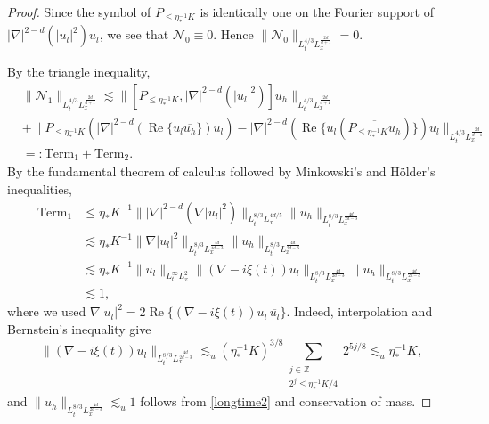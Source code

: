 \documentclass[reqno,11pt]{amsart}
\theoremstyle{plain}
\theoremstyle{definition}
\numberwithin{equation}{section}
\numberwithin{theorem}{section}
\def\leq{\leqslant}
\begin{document}
\begin{proof}
Since the symbol of $P_{\leq \eta_{\ast}^{-1}K}$ is identically one on the Fourier support of $|\nabla|^{2-d}(|u_l|^2)u_l$, we see that $\mathcal{N}_0 \equiv 0$. Hence $\|\mathcal{N}_0\|_{L_t^{4/3}L_x^{\frac{2d}{d+1}}} = 0$.

By the triangle inequality,
\begin{align*}
&\|\mathcal{N}_{1}\|_{L_{t}^{4/3}L_{x}^{\frac{2d}{d+1}}}
\lesssim \| [P_{\leq \eta_{\ast}^{-1}K},|\nabla |^{2-d}(|u_{l}|^{2})] u_{h}\|_{L_{t}^{4/3}L_{x}^{\frac{2d}{d+1}}} \\
&+\| P_{\leq \eta_{\ast}^{-1}K}(|\nabla |^{2-d}(\operatorname{Re}\{u_{l}\overline{u_{h}}\}) u_{l}) - |\nabla |^{2-d}(\operatorname{Re}\{u_{l}(\overline{P_{\leq \eta_{\ast}^{-1}K}u_{h}})\}) u_{l}\|_{L_{t}^{4/3}L_{x}^{\frac{2d}{d+1}}} \\
&=: \mathrm{Term}_{1} + \mathrm{Term}_{2}. 
\end{align*}
By the fundamental theorem of calculus followed by Minkowski's and Hölder's inequalities,
\begin{align*}
   \mathrm{Term}_{1}
&\leq \eta_{\ast}K^{-1}\| |\nabla |^{2-d}(\nabla |u_{l}|^{2})\|_{L_{t}^{8/3}L_{x}^{4d/5}}\| u_{h}\|_{L_{t}^{8/3}L_{x}^{\frac{4d}{2d-3}}} \\
&\lesssim \eta_{\ast}K^{-1}\| \nabla |u_{l}|^{2}\|_{L_{t}^{8/3}L_{x}^{\frac{4d}{4d-3}}}\| u_{h}\|_{L_{t}^{8/3}L_{x}^{\frac{4d}{2d-3}}} \\
&\lesssim \eta_{\ast}K^{-1}\| u_{l}\|_{L_{t}^{\infty}L_{x}^{2}}\| (\nabla -i\xi(t))u_{l}\|_{L_{t}^{8/3}L_{x}^{\frac{4d}{2d-3}}}\| u_{h}\|_{L_{t}^{8/3}L_{x}^{\frac{4d}{2d-3}}} \\
&\lesssim 1, 
\end{align*}
where we used
$\nabla|u_l|^2=2\operatorname{Re}\{(\nabla-i\xi(t))u_l\,\overline{u_l}\}$.
Indeed, interpolation and Bernstein's inequality give
\[
 \|(\nabla-i\xi(t))u_l\|_{L_t^{8/3}L_x^{\frac{4d}{2d-3}}}
 \lesssim_u(\eta_{\ast}^{-1}K)^{3/8}
       \sum_{\substack{j\in\mathbb Z\\2^j\leq\eta_{\ast}^{-1}K/4}}2^{5j/8}
 \lesssim_u\eta_{\ast}^{-1}K,
\]
and $\|u_h\|_{L_t^{8/3}L_x^{\frac{4d}{2d-3}}}\lesssim_u1$ follows from
\eqref{longtime2} and conservation of mass.


\end{proof}
\end{document}
